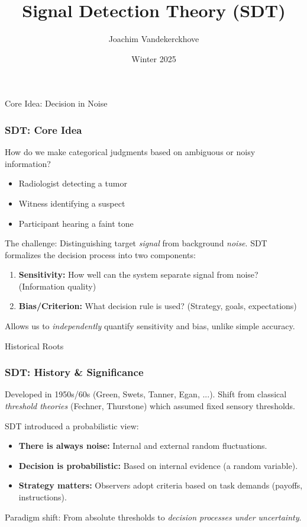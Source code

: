 \documentclass[aspectratio=169]{beamer}
\title{Signal Detection Theory (SDT)}
\author{Joachim Vandekerckhove}
\date{Winter 2025}
\begin{document}
\maketitle


\begin{frame}{Core Idea: Decision in Noise}
  \frametitle{SDT: Core Idea}
  How do we make categorical judgments based on ambiguous or noisy information?
  \begin{itemize}
    \item Radiologist detecting a tumor
    \item Witness identifying a suspect
    \item Participant hearing a faint tone
  \end{itemize}
  \pause
  The challenge: Distinguishing target \emph{signal} from background \emph{noise}.
  \pause
  SDT formalizes the decision process into two components:
  \begin{enumerate}
    \item \textbf{Sensitivity:} How well can the system separate signal from noise? (Information quality)
    \item \textbf{Bias/Criterion:} What decision rule is used? (Strategy, goals, expectations)
  \end{enumerate}
  \pause
  Allows us to \emph{independently} quantify sensitivity and bias, unlike simple accuracy.
\end{frame}

\begin{frame}{Historical Roots}
  \frametitle{SDT: History \& Significance}
  Developed in 1950s/60s (Green, Swets, Tanner, Egan, ...).
  \pause
  Shift from classical \emph{threshold theories} (Fechner, Thurstone) which assumed fixed sensory thresholds.
  \pause

  SDT introduced a probabilistic view:
  \begin{itemize}
    \item \textbf{There is always noise:} Internal and external random fluctuations.
    \item \textbf{Decision is probabilistic:} Based on internal evidence (a random variable).
    \item \textbf{Strategy matters:} Observers adopt criteria based on task demands (payoffs, instructions).
  \end{itemize}
  \pause
  
  Paradigm shift: From absolute thresholds to \emph{decision processes under uncertainty}.
\end{frame}
\end{document}
